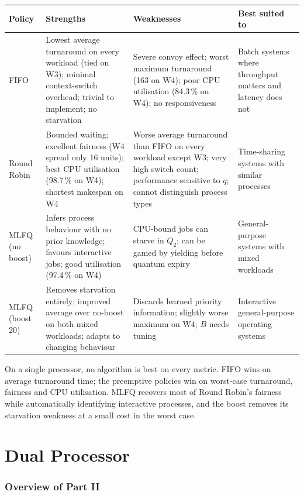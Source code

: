 \documentclass[11pt,a4paper]{article}
\begin{document}
\begin{center}\small
\begin{tabular}{l>{\raggedright\arraybackslash}p{4.1cm}>{\raggedright\arraybackslash}p{4.1cm}>{\raggedright\arraybackslash}p{3.2cm}}
\toprule
\textbf{Policy} & \textbf{Strengths} & \textbf{Weaknesses} & \textbf{Best suited to}\\
\midrule
FIFO & Lowest average turnaround on every workload (tied on W3); minimal context-switch
overhead; trivial to implement; no starvation & Severe convoy effect; worst maximum turnaround
(163 on W4); poor CPU utilisation (84.3\,\% on W4); no responsiveness & Batch systems where
throughput matters and latency does not \\ \addlinespace
Round Robin & Bounded waiting; excellent fairness (W4 spread only 16 units); best CPU
utilisation (98.7\,\% on W4); shortest makespan on W4 & Worse average turnaround than FIFO
on every workload except W3; very high switch count; performance sensitive to $q$; cannot distinguish process
types & Time-sharing systems with similar processes \\ \addlinespace
MLFQ (no boost) & Infers process behaviour with no prior knowledge; favours interactive
jobs; good utilisation (97.4\,\% on W4) & CPU-bound jobs can starve in $Q_2$; can be gamed by
yielding before quantum expiry & General-purpose systems with mixed workloads \\ \addlinespace
MLFQ (boost 20) & Removes starvation entirely; improved average over no-boost on both
mixed workloads; adapts to changing behaviour & Discards learned priority information;
slightly worse maximum on W4; $B$ needs tuning & Interactive general-purpose operating
systems \\
\bottomrule
\end{tabular}
\end{center}

On a single processor, no algorithm is best on every metric. FIFO wins on average
turnaround time; the preemptive policies win on worst-case turnaround, fairness and CPU
utilisation. MLFQ recovers most of Round Robin's fairness while automatically identifying
interactive processes, and the boost removes its starvation weakness at a small cost in the
worst case.
\newpage\part{Dual Processor}
\section{Overview of Part II}
\end{document}
